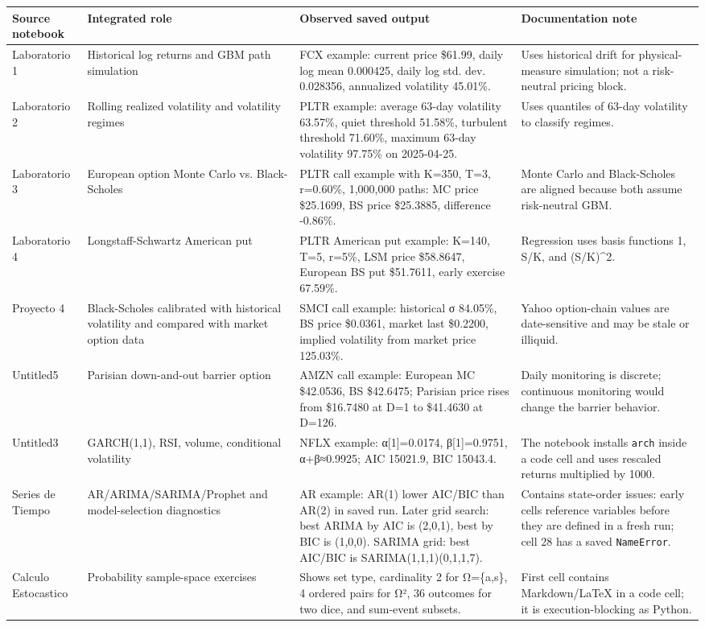 \documentclass[
  11pt,
]{article}
\begin{document}
\begin{longtable}[]{@{}llll@{}}
\toprule\noalign{}
Source notebook & Integrated role & Observed saved output & Documentation note \\
\midrule\noalign{}
\endhead
\bottomrule\noalign{}
\endlastfoot
Laboratorio 1 & Historical log returns and GBM path simulation & FCX example: current price \$61.99, daily log mean 0.000425, daily log std. dev. 0.028356, annualized volatility 45.01\%. & Uses historical drift for physical-measure simulation; not a risk-neutral pricing block. \\
Laboratorio 2 & Rolling realized volatility and volatility regimes & PLTR example: average 63-day volatility 63.57\%, quiet threshold 51.58\%, turbulent threshold 71.60\%, maximum 63-day volatility 97.75\% on 2025-04-25. & Uses quantiles of 63-day volatility to classify regimes. \\
Laboratorio 3 & European option Monte Carlo vs. Black-Scholes & PLTR call example with K=350, T=3, r=0.60\%, 1,000,000 paths: MC price \$25.1699, BS price \$25.3885, difference -0.86\%. & Monte Carlo and Black-Scholes are aligned because both assume risk-neutral GBM. \\
Laboratorio 4 & Longstaff-Schwartz American put & PLTR American put example: K=140, T=5, r=5\%, LSM price \$58.8647, European BS put \$51.7611, early exercise 67.59\%. & Regression uses basis functions 1, S/K, and (S/K)\^{}2. \\
Proyecto 4 & Black-Scholes calibrated with historical volatility and compared with market option data & SMCI call example: historical σ 84.05\%, BS price \$0.0361, market last \$0.2200, implied volatility from market price 125.03\%. & Yahoo option-chain values are date-sensitive and may be stale or illiquid. \\
Untitled5 & Parisian down-and-out barrier option & AMZN call example: European MC \$42.0536, BS \$42.6475; Parisian price rises from \$16.7480 at D=1 to \$41.4630 at D=126. & Daily monitoring is discrete; continuous monitoring would change the barrier behavior. \\
Untitled3 & GARCH(1,1), RSI, volume, conditional volatility & NFLX example: α{[}1{]}=0.0174, β{[}1{]}=0.9751, α+β≈0.9925; AIC 15021.9, BIC 15043.4. & The notebook installs \texttt{arch} inside a code cell and uses rescaled returns multiplied by 1000. \\
Series de Tiempo & AR/ARIMA/SARIMA/Prophet and model-selection diagnostics & AR example: AR(1) lower AIC/BIC than AR(2) in saved run. Later grid search: best ARIMA by AIC is (2,0,1), best by BIC is (1,0,0). SARIMA grid: best AIC/BIC is SARIMA(1,1,1)(0,1,1,7). & Contains state-order issues: early cells reference variables before they are defined in a fresh run; cell 28 has a saved \texttt{NameError}. \\
Calculo Estocastico & Probability sample-space exercises & Shows set type, cardinality 2 for Ω=\{a,s\}, 4 ordered pairs for Ω², 36 outcomes for two dice, and sum-event subsets. & First cell contains Markdown/LaTeX in a code cell; it is execution-blocking as Python. \\
\end{longtable}
\end{document}
